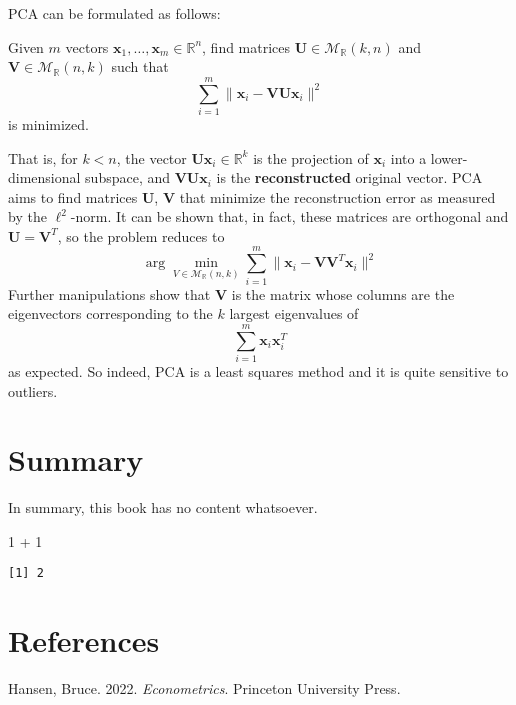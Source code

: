 \documentclass[
  letterpaper,
  DIV=11,
  numbers=noendperiod]{scrreprt}
\newenvironment{Shaded}{\begin{snugshade}}{\end{snugshade}}
\newcommand{\DecValTok}[1]{\textcolor[rgb]{0.68,0.00,0.00}{#1}}
\newcommand{\SpecialCharTok}[1]{\textcolor[rgb]{0.37,0.37,0.37}{#1}}
\newlength{\cslhangindent}
\newenvironment{CSLReferences}[2] %
 {\begin{list}{}{%
  \setlength{\itemindent}{0pt}
  \setlength{\leftmargin}{0pt}
  \setlength{\parsep}{0pt}
  \ifodd #1
   \setlength{\leftmargin}{\cslhangindent}
   \setlength{\itemindent}{-1\cslhangindent}
  \fi
  \setlength{\itemsep}{#2\baselineskip}}}
 {\end{list}}
\theoremstyle{definition}
\theoremstyle{plain}
\theoremstyle{remark}
\begin{document}
PCA can be formulated as follows:

Given \(m\) vectors \(\pmb{x}_1, \ldots, \pmb{x}_m \in \mathbb{R}^n\),
find matrices \(\pmb{U} \in \mathcal{M}_{\mathbb{R}} (k,n)\) and
\(\pmb{V} \in \mathcal{M}_{\mathbb{R}}(n,k)\) such that \[
\sum_{i=1}^m \| \pmb{x}_i - \pmb{V}\pmb{U}\pmb{x}_i\|^2
\] is minimized.

That is, for \(k<n\), the vector \(\pmb{U}\pmb{x}_i \in \mathbb{R}^k\)
is the projection of \(\pmb{x}_i\) into a lower-dimensional subspace,
and \(\pmb{V}\pmb{U}\pmb{x}_i\) is the \textbf{reconstructed} original
vector. PCA aims to find matrices \(\pmb{U}\), \(\pmb{V}\) that minimize
the reconstruction error as measured by the \(\ell^2\)-norm. It can be
shown that, in fact, these matrices are orthogonal and
\(\pmb{U} = \pmb{V}^T\), so the problem reduces to \[
\arg\min_{V\in \mathcal{M}_{\mathbb{R}}(n,k)}\sum_{i=1}^m \| \pmb{x}_i - \pmb{V}\pmb{V}^T \pmb{x}_i \|^2
\] Further manipulations show that \(\pmb{V}\) is the matrix whose
columns are the eigenvectors corresponding to the \(k\) largest
eigenvalues of \[
\sum_{i=1}^m \pmb{x}_i \pmb{x}_i^T
\] as expected. So indeed, PCA is a least squares method and it is quite
sensitive to outliers.


\chapter{Summary}\label{summary}

In summary, this book has no content whatsoever.

\begin{Shaded}
\begin{Highlighting}[]
\DecValTok{1} \SpecialCharTok{+} \DecValTok{1}
\end{Highlighting}
\end{Shaded}

\begin{verbatim}
[1] 2
\end{verbatim}


\chapter*{References}\label{references}


\label{refs}
\begin{CSLReferences}{1}{0}
Hansen, Bruce. 2022. \emph{Econometrics}. Princeton University Press.

\end{CSLReferences}
\end{document}
